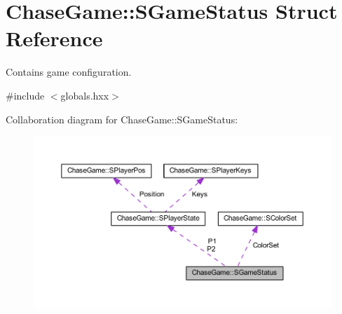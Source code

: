 \hypertarget{struct_chase_game_1_1_s_game_status}{\section{Chase\-Game\-:\-:S\-Game\-Status Struct Reference}
\label{struct_chase_game_1_1_s_game_status}
}


Contains game configuration.  




{\ttfamily \#include $<$globals.\-hxx$>$}



Collaboration diagram for Chase\-Game\-:\-:S\-Game\-Status\-:
\nopagebreak
\begin{figure}[H]
\begin{center}
\leavevmode
\includegraphics[width=350pt]{struct_chase_game_1_1_s_game_status__coll__graph}
\end{center}
\end{figure}
